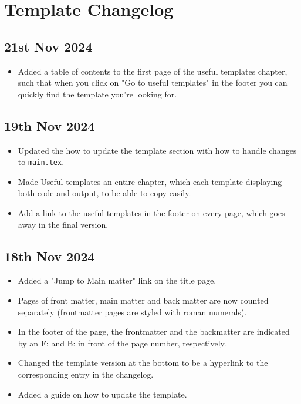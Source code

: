\chapter*{Template Changelog}

\section*{21st Nov 2024} \label{sec:changelog:2024/11/21}
\begin{itemize}
    \item Added a table of contents to the first page of the useful templates chapter, such that when you click on "Go to useful templates" in the footer you can quickly find the template you're looking for.
\end{itemize}

\section*{19th Nov 2024} \label{sec:changelog:2024/11/19}
\begin{itemize}
    \item Updated the how to update the template section with how to handle changes to \verb|main.tex|.
    \item Made Useful templates an entire chapter, which each template displaying both code and output, to be able to copy easily.
    \item Add a link to the useful templates in the footer on every page, which goes away in the final version.
\end{itemize}

\section*{18th Nov 2024} \label{sec:changelog:2024/11/18}
\begin{itemize}
    \item Added a "Jump to Main matter" link on the title page.
    \item Pages of front matter, main matter and back matter are now counted separately (frontmatter pages are styled with roman numerals).
    \item In the footer of the page, the frontmatter and the backmatter are indicated by an F: and B: in front of the page number, respectively.
    \item Changed the template version at the bottom to be a hyperlink to the corresponding entry in the changelog.
    \item Added a guide on how to update the template.
\end{itemize}